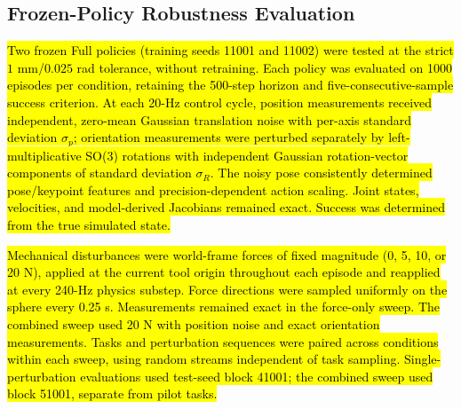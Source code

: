 \begingroup
\subsection{Frozen-Policy Robustness Evaluation}
\hl{Two frozen Full policies (training seeds 11001 and 11002) were tested at the strict $1$ mm/$0.025$ rad tolerance, without retraining. Each policy was evaluated on 1000 episodes per condition, retaining the 500-step horizon and five-consecutive-sample success criterion. At each 20-Hz control cycle, position measurements received independent, zero-mean Gaussian translation noise with per-axis standard deviation $\sigma_p$; orientation measurements were perturbed separately by left-multiplicative SO(3) rotations with independent Gaussian rotation-vector components of standard deviation $\sigma_R$. The noisy pose consistently determined pose/keypoint features and precision-dependent action scaling. Joint states, velocities, and model-derived Jacobians remained exact. Success was determined from the true simulated state.}

\hl{Mechanical disturbances were world-frame forces of fixed magnitude (0, 5, 10, or 20 N), applied at the current tool origin throughout each episode and reapplied at every 240-Hz physics substep. Force directions were sampled uniformly on the sphere every 0.25 s. Measurements remained exact in the force-only sweep. The combined sweep used 20 N with position noise and exact orientation measurements. Tasks and perturbation sequences were paired across conditions within each sweep, using random streams independent of task sampling. Single-perturbation evaluations used test-seed block 41001; the combined sweep used block 51001, separate from pilot tasks.}
\par\endgroup
